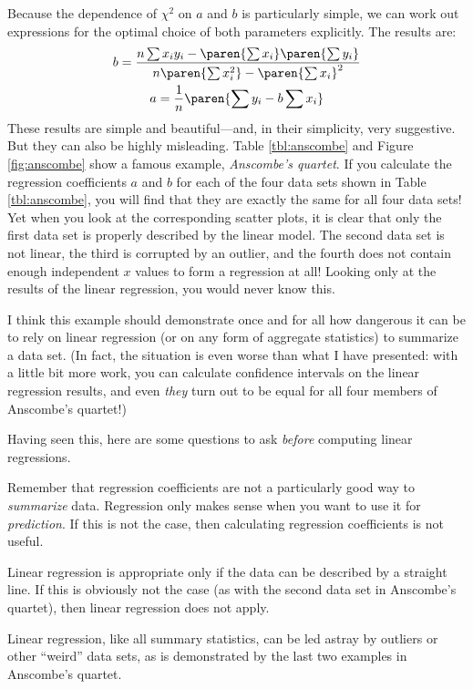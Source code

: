 Because the dependence of $\chi^2$ on $a$ and $b$ is particularly
simple, we can work out expressions for the optimal choice of both
parameters explicitly. The results are:
%
\begin{gather*}
b = \frac{n \sum x_i y_i - \paren{\sum x_i} \paren{\sum y_i} }
         {n \paren{\sum x_i^2} - \paren{\sum x_i}^2 } \\
a = \frac{1}{n} \paren{\sum y_i - b \sum x_i}
\end{gather*}
%
These results are simple and beautiful---and, in their simplicity,
very suggestive. But they can also be highly misleading.  Table
\ref{tbl:anscombe} and Figure \ref{fig:anscombe} show a famous
example, \emph{Anscombe's quartet}.  If you calculate the
regression coefficients $a$ and $b$ for each of the four data sets shown in Table
\ref{tbl:anscombe}, you will find that they are exactly the same for
all four data sets! Yet when you look at the corresponding scatter
plots, it is clear that only the first data set is properly described
by the linear model. The second data set is not linear, the third is
corrupted by an outlier, and the fourth does not contain enough
independent $x$ values to form a regression at all! Looking only at
the results of the linear regression, you would never know this.

 

I think this example should demonstrate once and for all how dangerous
it can be to rely on linear regression (or on any form of aggregate
statistics) to summarize a data set. (In fact, the situation is even
worse than what I have presented: with a little bit more work, you can
calculate confidence intervals on the linear regression results, and
even \emph{they} turn out to be equal for all four members of
Anscombe's quartet!)

Having seen this, here are some questions to ask \emph{before}
computing linear regressions.

\begin{unnumlist}
\item Remember that regression coefficients
  are not a particularly good way to \emph{summarize} data. Regression
  only makes sense when you want to use it for \emph{prediction}. If
  this is not the case, then calculating regression coefficients is not
  useful.

\item Linear regression is 
  appropriate only if the data can be described by a straight line.
  If this is obviously not the case (as with the second data set in
  Anscombe's quartet), then linear regression does not apply. 

\item
Linear regression,
  like all summary statistics, can be led astray by outliers or
  other ``weird'' data sets, as is demonstrated by the last two
  examples in Anscombe's quartet. 
\end{unnumlist}

